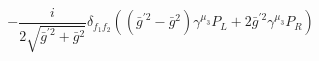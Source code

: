%
\begin{dmath*}
%
  -  \frac{i}{2 \sqrt{{\bar g}^{\prime 2} + {\bar g}{}^2}}\delta_{f_1 f_2} \left(\left({\bar g}^{\prime 2} - {\bar g}{}^2\right) \gamma^{\mu_3} P_L + 2 {\bar g}^{\prime 2} \gamma^{\mu_3} P_R\right)
%
\end{dmath*}
%

